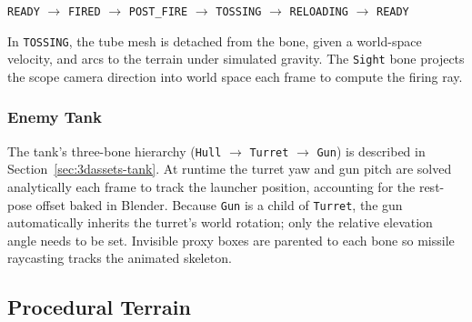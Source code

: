\documentclass[11pt, a4paper]{article}
\begin{document}
	\begin{center}
		\texttt{READY} $\to$ \texttt{FIRED} $\to$ \texttt{POST\_FIRE} $\to$
		\texttt{TOSSING} $\to$ \texttt{RELOADING} $\to$ \texttt{READY}
	\end{center}

	In \texttt{TOSSING}, the tube mesh is detached from the bone, given a world-space
	velocity, and arcs to the terrain under simulated gravity. The \texttt{Sight} bone
	projects the scope camera direction into world space each frame to compute the firing
	ray.

	\subsubsection{Enemy Tank}
	\label{sec:tech-tank}

	The tank's three-bone hierarchy (\texttt{Hull} $\to$ \texttt{Turret} $\to$ \texttt{Gun})
	is described in Section~\ref{sec:3dassets-tank}. At runtime the turret yaw and gun pitch
	are solved analytically each frame to track the launcher position, accounting for the
	rest-pose offset baked in Blender. Because \texttt{Gun} is a child of \texttt{Turret},
	the gun automatically inherits the turret's world rotation; only the relative elevation
	angle needs to be set. Invisible proxy boxes are parented to each bone so missile
	raycasting tracks the animated skeleton.

	\subsection{Procedural Terrain}
\end{document}
